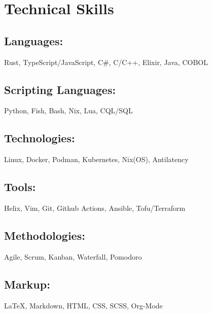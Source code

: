 \section{Technical Skills}

\subsection{Languages:} Rust, TypeScript/JavaScript, C\#, C/C++, Elixir, Java, COBOL
\subsection{Scripting Languages:} Python, Fish, Bash, Nix, Lua, CQL/SQL 
\subsection{Technologies:} Linux, Docker, Podman, Kubernetes, Nix(OS), Antilatency 
\subsection{Tools:} Helix, Vim, Git, Github Actions, Ansible, Tofu/Terraform
\subsection{Methodologies:} Agile, Scrum, Kanban, Waterfall, Pomodoro
\subsection{Markup:} {\LaTeX}, Markdown, HTML, CSS, SCSS, Org-Mode
